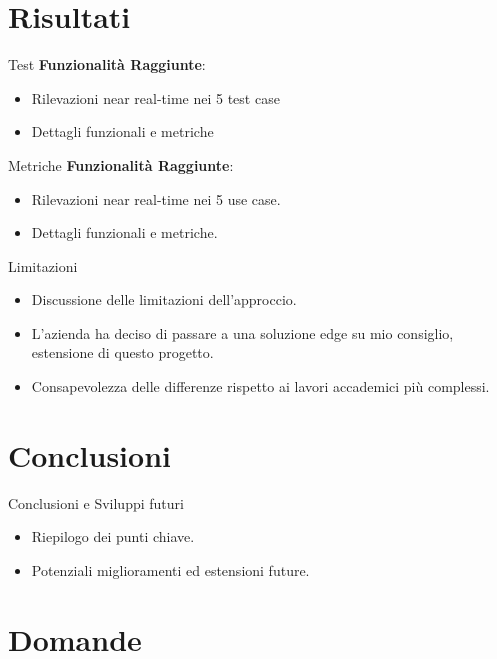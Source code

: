 \documentclass{beamer}
\begin{document}
\section{Risultati}

\begin{frame}{Test}
\textbf{Funzionalità Raggiunte}:
\begin{itemize}
    \item Rilevazioni near real-time nei 5 test case
    \item Dettagli funzionali e metriche
\end{itemize}
\end{frame}

\begin{frame}{Metriche}
\textbf{Funzionalità Raggiunte}:
\begin{itemize}
    \item Rilevazioni near real-time nei 5 use case.
    \item Dettagli funzionali e metriche.
\end{itemize}
\end{frame}

\begin{frame}{Limitazioni}
\begin{itemize}
    \item Discussione delle limitazioni dell'approccio.
    \item L'azienda ha deciso di passare a una soluzione edge su mio consiglio, estensione di questo progetto.
    \item Consapevolezza delle differenze rispetto ai lavori accademici più complessi.
\end{itemize}
\end{frame}

\section{Conclusioni}

\begin{frame}{Conclusioni e Sviluppi futuri}
\begin{itemize}
    \item Riepilogo dei punti chiave.
    \item Potenziali miglioramenti ed estensioni future.
\end{itemize}
\end{frame}

\section*{Domande}

\backmatter
\end{document}
